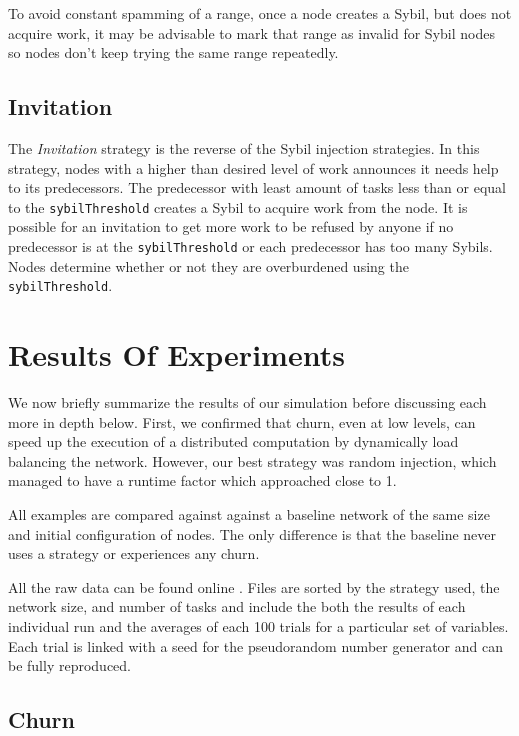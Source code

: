 To avoid constant spamming of a range, once a node creates a Sybil, but does not acquire work, it may be advisable to mark that range as invalid for Sybil nodes so nodes don't keep trying the same range repeatedly. 


\subsection{Invitation}
The \textit{Invitation} strategy is the reverse of the Sybil injection strategies.
In  this strategy, nodes with a higher than desired level of work announces it needs help to its predecessors.
The predecessor with least amount of tasks less than or equal to the \texttt{sybilThreshold} creates a Sybil to acquire work from the node.
It is possible for an invitation to get more work to be refused by anyone if no  predecessor is at the \texttt{sybilThreshold} or each predecessor has too many Sybils.
Nodes determine whether or not they are overburdened using the \texttt{sybilThreshold}.



\section{Results Of Experiments}
\label{sec:autonomous-results}

We now briefly summarize the results of our simulation before discussing each more in depth below.
First, we confirmed that churn, even at low levels, can speed up the execution of a distributed computation by dynamically load balancing the network.
However, our best strategy was random injection, which managed to have a runtime factor which approached close to 1.

All examples are compared against against a baseline network of the same size and initial configuration of nodes. 
The only difference is that the baseline never uses a strategy or experiences any churn.

All the raw data can be found online \cite{simulation-data}.
Files are sorted by the strategy used, the network size,  and number of tasks and include the both the results of each individual run and the averages of each 100 trials for a particular set of variables.
Each trial is linked with a seed for the pseudorandom number generator and can be fully reproduced.


\subsection{Churn}

